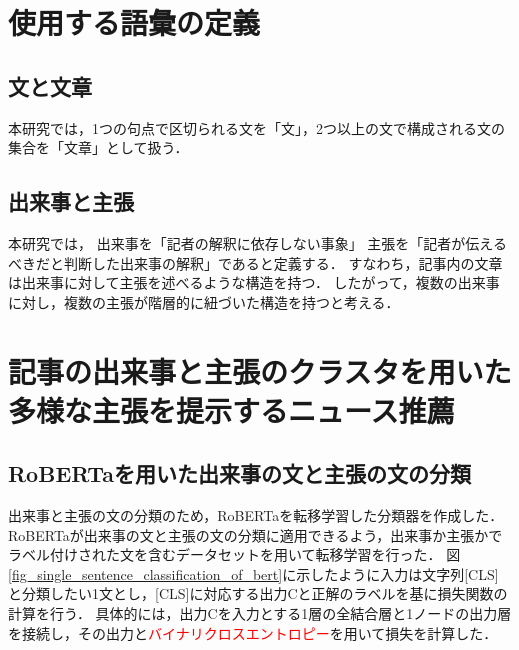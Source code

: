 \documentclass[12pt,a4j]{jreport}
\begin{document}
\section{使用する語彙の定義}
\label{section_term_definition}

\subsection{文と文章}
本研究では，1つの句点で区切られる文を「文」，2つ以上の文で構成される文の集合を「文章」として扱う．

\subsection{出来事と主張}
本研究では，
出来事を「記者の解釈に依存しない事象」
主張を「記者が伝えるべきだと判断した出来事の解釈」であると定義する．
すなわち，記事内の文章は出来事に対して主張を述べるような構造を持つ．
したがって，複数の出来事に対し，複数の主張が階層的に紐づいた構造を持つと考える．


\section{記事の出来事と主張のクラスタを用いた多様な主張を提示するニュース推薦}
\label{section_method_detail}



\subsection{RoBERTaを用いた出来事の文と主張の文の分類}
\label{subsection_classify_method}
出来事と主張の文の分類のため，RoBERTaを転移学習した分類器を作成した．
RoBERTaが出来事の文と主張の文の分類に適用できるよう，出来事か主張かでラベル付けされた文を含むデータセットを用いて転移学習を行った．
図\ref{fig_single_sentence_classification_of_bert}に示したように入力は文字列[CLS]と分類したい1文とし，[CLS]に対応する出力Cと正解のラベルを基に損失関数の計算を行う．
具体的には，出力Cを入力とする1層の全結合層と1ノードの出力層を接続し，その出力と\textcolor{red}{バイナリクロスエントロピー}を用いて損失を計算した．
\end{document}
